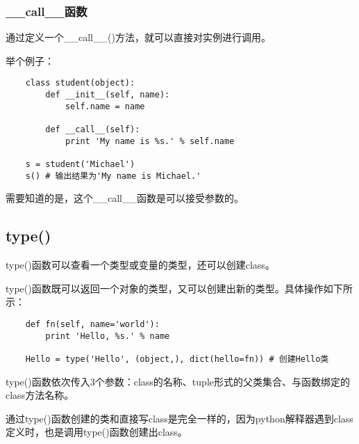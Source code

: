 \documentclass[a4paper,left=2.5cm,right=2.5cm,11pt]{article}
\begin{document}
\subsubsection{\_\_call\_\_函数}
	通过定义一个\_\_call\_\_()方法，就可以直接对实例进行调用。\par

	举个例子：
	\begin{lstlisting}
	class student(object):
		def __init__(self, name):
			self.name = name
		
		def __call__(self):
			print 'My name is %s.' % self.name

	s = student('Michael')
	s() # 输出结果为'My name is Michael.'
	\end{lstlisting}

	需要知道的是，这个\_\_call\_\_函数是可以接受参数的。

\subsection{type()}
	type()函数可以查看一个类型或变量的类型，还可以创建class。\par

	type()函数既可以返回一个对象的类型，又可以创建出新的类型。具体操作如下所示：
	\begin{lstlisting}
	def fn(self, name='world'):
		print 'Hello, %s.' % name

	Hello = type('Hello', (object,), dict(hello=fn)) # 创建Hello类
	\end{lstlisting}

	type()函数依次传入3个参数：class的名称、tuple形式的父类集合、与函数绑定的class方法名称。\par

	通过type()函数创建的类和直接写class是完全一样的，因为python解释器遇到class定义时，也是调用type()函数创建出class。
\end{document}
